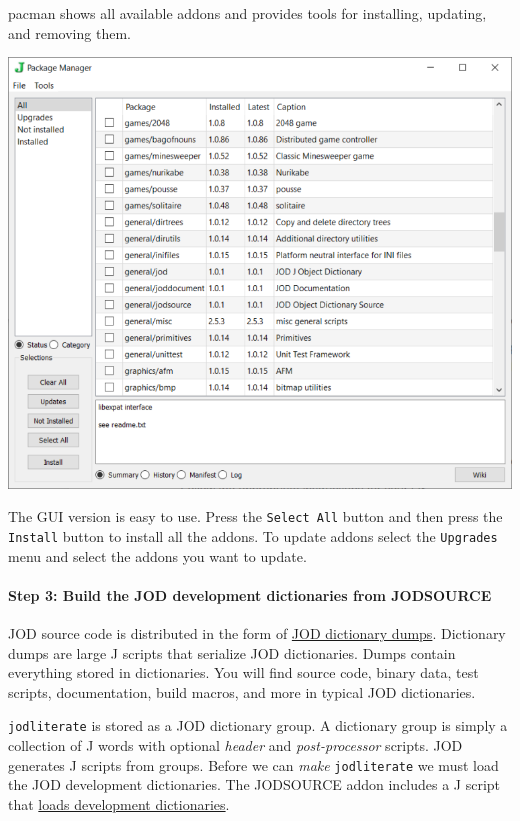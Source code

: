 pacman shows all available addons and provides tools for installing,
updating, and removing them.

\includegraphics{inclusions/jqt_pacman.png}

The GUI version is easy to use. Press the \texttt{Select\ All} button
and then press the \texttt{Install} button to install all the addons. To
update addons select the \texttt{Upgrades} menu and select the addons
you want to update.

    \hypertarget{step-3-build-the-jod-development-dictionaries-from-jodsource}{%
\paragraph{Step 3: Build the JOD development dictionaries from
JODSOURCE}\label{step-3-build-the-jod-development-dictionaries-from-jodsource}}

JOD source code is distributed in the form of
\href{https://github.com/bakerjd99/joddumps}{JOD dictionary dumps}.
Dictionary dumps are large J scripts that serialize JOD dictionaries.
Dumps contain everything stored in dictionaries. You will find source
code, binary data, test scripts, documentation, build macros, and more
in typical JOD dictionaries.

\texttt{jodliterate} is stored as a JOD dictionary group. A dictionary
group is simply a collection of J words with optional \emph{header} and
\emph{post-processor} scripts. JOD generates J scripts from groups.
Before we can \emph{make} \texttt{jodliterate} we must load the JOD
development dictionaries. The JODSOURCE addon includes a J script that
\href{https://github.com/bakerjd99/jod/blob/master/jodsource/jodsourcesetup.ijs}{loads
development dictionaries}.

